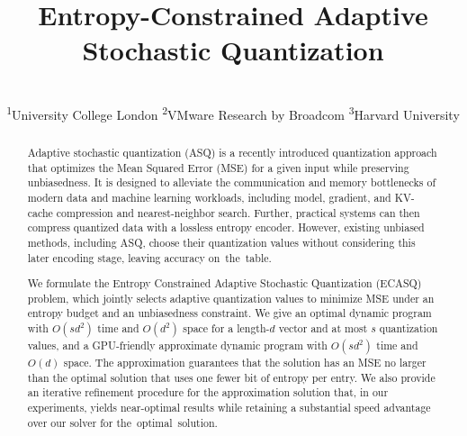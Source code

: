 \documentclass[11pt,letterpaper]{article}
\title{Entropy-Constrained Adaptive Stochastic Quantization}
\date{}
\author{\makebox[\textwidth][c]{\small Ran Ben Basat\textsuperscript{1,2}\quad Yaniv Ben-Itzhak\textsuperscript{2}\quad Michael Mitzenmacher\textsuperscript{3}\quad Shay Vargaftik\textsuperscript{2}}\\[0.5em]
\small \textsuperscript{1}University College London\quad
\textsuperscript{2}VMware Research by Broadcom\quad
\textsuperscript{3}Harvard University}
\begin{document}
\maketitle

\begin{abstract}
Adaptive stochastic quantization (ASQ) is a recently introduced quantization approach that optimizes the Mean Squared Error (MSE) for a given input while preserving unbiasedness. It is designed to alleviate the communication and memory bottlenecks of modern data and machine learning workloads, including model, gradient, and KV-cache compression and nearest-neighbor search. 
%
Further, practical systems can then compress quantized data with a lossless entropy encoder. 
%
However, existing unbiased methods, including ASQ, choose their quantization values without considering this later encoding stage, leaving accuracy \mbox{on the table.}

We formulate the Entropy Constrained Adaptive Stochastic Quantization (ECASQ) problem, which jointly selects adaptive quantization values to minimize MSE under an entropy budget and an unbiasedness constraint. We give an optimal dynamic program with $O(sd^2)$ time and $O(d^2)$ space for a length-$d$ vector and at most $s$ quantization values, and a GPU-friendly approximate dynamic program with $O(sd^2)$ time and $O(d)$ space. The approximation guarantees that the solution has an MSE no larger than the optimal solution that uses one fewer bit of entropy per entry. We also provide an iterative refinement procedure for the approximation solution that, in our experiments, yields near-optimal results while retaining a substantial speed advantage over our solver for \mbox{the optimal solution.}




\end{abstract}
\end{document}
